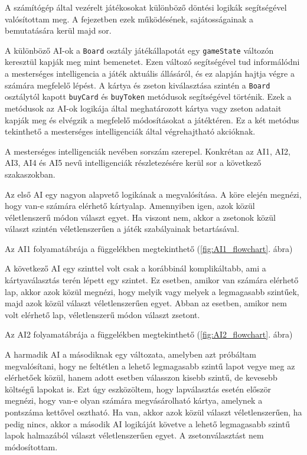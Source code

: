 
A számítógép által vezérelt játékosokat különböző döntési logikák segítségével valósítottam meg. A fejezetben ezek működésének, sajátosságainak a bemutatására kerül majd sor.

A különböző AI-ok a \texttt{Board} osztály játékállapotát egy \texttt{gameState} változón keresztül kapják meg mint bemenetet. Ezen változó segítségével tud informálódni a mesterséges intelligencia a játék aktuális állásáról, és ez alapján hajtja végre a számára megfelelő lépést. A kártya és zseton kiválasztása szintén a \texttt{Board} osztálytól kapott \texttt{buyCard} és \texttt{buyToken} metódusok segítségével történik. Ezek a metódusok az AI-ok logikája által meghatározott kártya vagy zseton adatait kapják meg és elvégzik a megfelelő módosításokat a játéktéren. Ez a két metódus tekinthető a mesterséges intelligenciák által végrehajtható akcióknak.

A mesterséges intelligenciák nevében sorszám szerepel. Konkrétan az AI1, AI2, AI3, AI4 és AI5 nevű intelligenciák részletezésére kerül sor a következő szakaszokban.


Az első AI egy nagyon alapvető logikának a megvalósítása. A köre elején megnézi, hogy van-e számára elérhető kártyalap. Amennyiben igen, azok közül véletlenszerű módon választ egyet. Ha viszont nem, akkor a zsetonok közül választ szintén véletlenszerűen a játék szabályainak betartásával.

Az AI1 folyamatábrája a függelékben megtekinthető (\ref{fig:AI1_flowchart}. ábra)



A következő AI egy szinttel volt csak a korábbinál komplikáltabb, ami a kártyaválasztás terén lépett egy szintet. Ez esetben, amikor van számára elérhető lap, akkor azok közül megnézi, hogy melyik vagy melyek a legmagasabb szintűek, majd azok közül választ véletlenszerűen egyet. Abban az esetben, amikor nem volt elérhető lap, véletlenszerű módon választ zsetont.

Az AI2 folyamatábrája a függelékben megtekinthető (\ref{fig:AI2_flowchart}. ábra)



A harmadik AI a másodiknak egy változata, amelyben azt próbáltam megvalósítani, hogy ne feltétlen a lehető legmagasabb szintű lapot vegye meg az elérhetőek közül, hanem adott esetben válasszon kisebb szintű, de kevesebb költségű lapokat is. Ezt úgy eszközöltem, hogy lapválasztás esetén először megnézi, hogy van-e olyan számára megvásárolható kártya, amelynek a pontszáma kettővel osztható. Ha van, akkor azok közül választ véletlenszerűen, ha pedig nincs, akkor a második AI logikáját követve a lehető legmagasabb szintű lapok halmazából választ véletlenszerűen egyet. A zsetonválasztást nem módosítottam.


